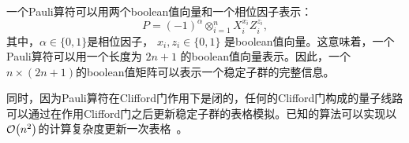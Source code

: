 一个Pauli算符可以用两个boolean值向量和一个相位因子表示：
\begin{equation}
    P = (-1)^\alpha \otimes_{i=1}^n X_i^{x_i} Z_i^{z_i},
\end{equation}
其中，$\alpha\in\{0,1\}$是相位因子，  $x_i, z_i\in\{0,1\}$  是boolean值向量。这意味着，一个Pauli算符可以用一个长度为  $2n+1$  的boolean值向量表示。因此，一个$n\times (2n+1)$的boolean值矩阵可以表示一个稳定子群的完整信息。

同时，因为Pauli算符在Clifford门作用下是闭的，任何的Clifford门构成的量子线路可以通过在作用Clifford门之后更新稳定子群的表格模拟。已知的算法可以实现以$\order{n^2}$的计算复杂度更新一次表格~\cite{bravyi2005efficient}。